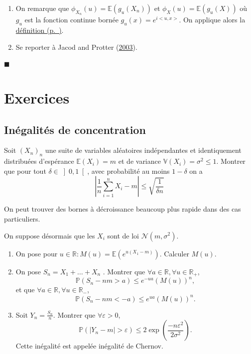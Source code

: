 \begin{preuve}
\begin{enumerate}
\def\labelenumi{\arabic{enumi}.}
\tightlist
\item
  On remarque que \(\phi_{X_n}(u) = \mathbb{E}(g_u(X_n))\) et
  \(\phi_X(u) = \mathbb{E}(g_u(X))\) où \(g_u\) est la fonction continue
  bornée \(g_u(x) = e^{i < u,x>}\). On applique alors la
  \protect\hyperref[IV-defconvloi]{définition (p.~\pageref*{IV-defconvloi})}.
\item
  Se reporter à Jacod and Protter (\protect\hyperlink{refIV-Jacod}{2003}).
\end{enumerate}

\hfill$\blacksquare$
\end{preuve}

\chapter{Exercices}\label{IV-exercices}

\section{Inégalités de
concentration}\label{IV-inuxe9galituxe9s-de-concentration}

\label{IV-idc1}
Soit \((X_n)_n\) une suite de variables aléatoires indépendantes et
identiquement distribuées d'espérance \(\mathbb{E}(X_i) = m\) et de
variance \(\mathbb{V}(X_i) = \sigma^2 \leq 1\). Montrer que pour tout
\(\delta \in \left]0,1\right[\), avec probabilité au moins \(1-\delta\)
on a
\[\left|\frac{1}{n}\sum_{i=1}^n X_i - m \right| \leq \sqrt{\frac{1}{\delta n}}\]

On peut trouver des bornes à décroissance beaucoup plus rapide dans des
cas particuliers.

\label{IV-idc2}
On suppose désormais que les \(X_i\) sont de loi
\(\mathcal{N}(m, \sigma^2 )\).

\begin{enumerate}
\def\labelenumi{\roman{enumi})}
\item
  On pose pour \(u \in \mathbb{R}: M(u) = \mathbb{E}(e^{u(X_1 -m)})\).
  Calculer \(M (u)\).
\item
  On pose \(S_n = X_1 + \ldots + X_n\) . Montrer que
  \(\forall a \in \mathbb{R}, \forall u \in \mathbb{R}_+\),
  \[\mathbb{P}(S_n - nm > a) \leq e^{-ua} (M(u))^n,\] et que
  \(\forall a \in \mathbb{R}, \forall u \in \mathbb{R}_-\),
  \[\mathbb{P}(S_n - nm < -a) \leq e^{ua} (M(u))^n.\]
\item
  Soit \(Y_n =\frac{S_n}{n}\). Montrer que \(\forall \varepsilon >0\),
  \[\mathbb{P}(|Y_n - m| > \varepsilon) \leq 2 \exp\left(\frac{-n\varepsilon^2}{2\sigma^2}\right).\]
  Cette inégalité est appelée inégalité de Chernov.
\end{enumerate}

